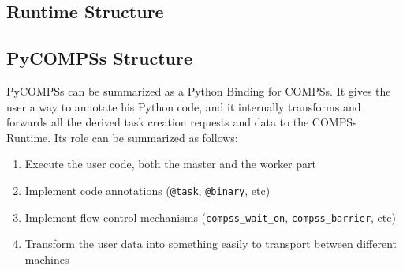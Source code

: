 \subsection{Runtime Structure}
\label{subsec:runtime_structure}

\subsection{PyCOMPSs Structure}
\label{subsec:pycompss_structure}
PyCOMPSs can be summarized as a Python Binding for COMPSs. It gives the user a way to annotate his Python code, and it internally transforms and forwards all the derived task creation requests and data to the COMPSs Runtime. Its role can be summarized as follows:
\begin{enumerate}
\item Execute the user code, both the master and the worker part
\item Implement code annotations (\verb|@task|, \verb|@binary|, etc)
\item Implement flow control mechanisms (\verb|compss_wait_on|, \verb|compss_barrier|, etc)
\item Transform the user data into something easily to transport between different machines
\end{enumerate}

